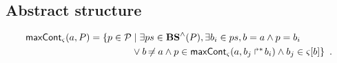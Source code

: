 \begin{comment}
==========================

Bonds possibles :
\begin{align*}
\bounceprocs_\ctx = \{ a_i \in \PHproc \mid \exists s \in \ctx, \exists \delta \in \restriction{\Sce}{k-1}, a_i \in (s \PHplay \delta) \}
\end{align*}
\end{comment}


\begin{comment}
Séquences de bonds abstraites :
$$\BS^\wedge(P) = \{ \zeta^\wedge \mid \zeta \in \BS(P), \nexists \zeta' \in \BS(P), \zeta'^\wedge \subsetneq \zeta^\wedge \}$$
where $\zeta^\wedge = (\zeta^\wedge_A, \zeta^\wedge_B, \zeta^\wedge_{max})$ with:
\begin{itemize}
  \item $\zeta^\wedge_A = \{ \PHhitter(\zeta_n) \mid n \in \indexes{\zeta} \wedge \PHsort(\PHhitter(\zeta_n)) \neq \PHsort(P) \}$ : ens. des requis d'autres sortes (frappeurs)
  \item $\zeta^\wedge_B = \{ \PHhitter(\zeta_n) \mid n \in \indexes{\zeta} \} \cup \{ \PHtarget(\zeta_n) \mid n \in \indexes{\zeta} \}$ : ens. des processus nécessaires (à ne pas perturber)
  \item $\zeta^\wedge_{max} = \max_{n \in \indexes{\zeta}}(\prio(\zeta_n))$ : plus faible priorité
\end{itemize}
\end{comment}

\subsection{Abstract structure}

\begin{definition}[$\gCont_\ctx : \Sigma \times \Obj \mapsto \powerset(\Proc)$]
  \label{def:maxCont}
  \begin{align*}
    \mathsf{maxCont}_\varsigma(a,P) = 
    \{ p \in \mathcal{P} &\mid \exists ps \in \mathbf{BS}^\wedge(P), \exists b_i \in ps, b = a \wedge p = b_i \\
      & \vee b \not\nobreak\mkern -2mu = a \wedge p \in \mathsf{maxCont}_\varsigma(a, \mbox{$b_j\Rsh^*\!b_i$}) \wedge b_j \in {\varsigma[b]} \}
    \enspace.
  \end{align*}
\end{definition}

